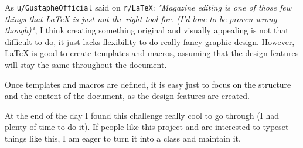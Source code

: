 \documentclass[10pt]{article}
\begin{document}
\begin{article*}

\lettrine{A}{}s \texttt{u/GustapheOfficial} said on \texttt{r/\LaTeX{}}: \textit{"Magazine editing is one of those few things that LaTeX is just not the right tool for. (I'd love to be proven
wrong though)"}, I think creating something original and visually appealing is not that difficult to do, it just lacks flexibility to do really fancy graphic design. However, \LaTeX{} is good to create templates and macros, assuming that the design features will stay the same throughout the document.

Once templates and macros are defined, it is easy just to focus on the structure and the content of the document, as the design features are created.

At the end of the day I found this challenge really cool to go through (I had plenty of time to do it). If people like this project and are interested to typeset things like this, I am eager to turn it into a class and maintain it.

\end{article*}
\end{document}
